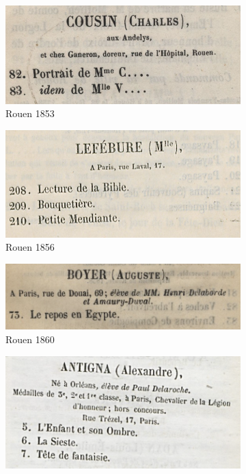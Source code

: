 \documentclass[a4paper,12pt,twoside]{book}
\begin{document}
	\begin{figure}
	
		\begin{subfigure}{0.5\textwidth}
		\includegraphics[scale=0.5]{rouen1853.png}
		\centering
		\caption{Rouen 1853}
	\end{subfigure}
		\begin{subfigure}{0.5\textwidth}
		\includegraphics[scale=0.5]{rouen1856.png}
		\centering
		\caption{Rouen 1856}
	\end{subfigure}
		\begin{subfigure}{0.5\textwidth}
		\includegraphics[scale=0.5]{rouen1860.png}
		\centering
		\caption{Rouen 1860}
	\end{subfigure}
		\begin{subfigure}{0.5\textwidth}
		\includegraphics[scale=0.5]{rouen1869.png}

\end{subfigure}
\end{figure}
\end{document}
